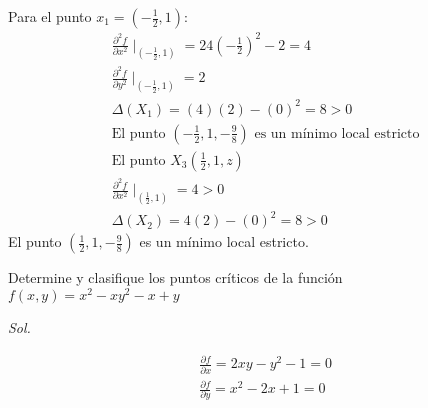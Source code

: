 Para el punto $x_1=\left(-\frac{1}{2},1\right)$:
\begin{align*}
	 & \frac{\partial^2 f}{\partial x^2}\mid_{\left(-\frac{1}{2},1\right)}=24\left(-\frac{1}{2}\right)^2-2=4 \\
	 & \frac{\partial^2 f}{\partial y^2}\mid_{\left(-\frac{1}{2},1\right)}=2                                 \\
	 & \Delta (X_1)=(4)(2)-(0)^2=8>0                                                                         \\
	 & \text{El punto }\left(-\frac{1}{2},1,-\frac{9}{8}\right)\text{ es un mínimo local estricto}           \\
	 & \text{El punto }X_3\left(\frac{1}{2},1,z\right)                                                       \\
	 & \frac{\partial^2 f}{\partial x^2}\mid_{\left(\frac{1}{2},1\right)}=4>0                                \\
	 & \Delta(X_2)=4(2)-(0)^2=8>0
\end{align*}
El punto $\left(\frac{1}{2},1,-\frac{9}{8}\right)$ es un mínimo local estricto.

\begin{example}
	Determine y clasifique los puntos críticos de la función $f(x,y)=x^2-xy^2-x+y$
\end{example}

\textit{ Sol. }

\begin{align*}
	 & \frac{\partial f}{\partial x}=2xy-y^2-1=0 \\
	 & \frac{\partial f}{\partial y}=x^2-2x+1=0
\end{align*}

